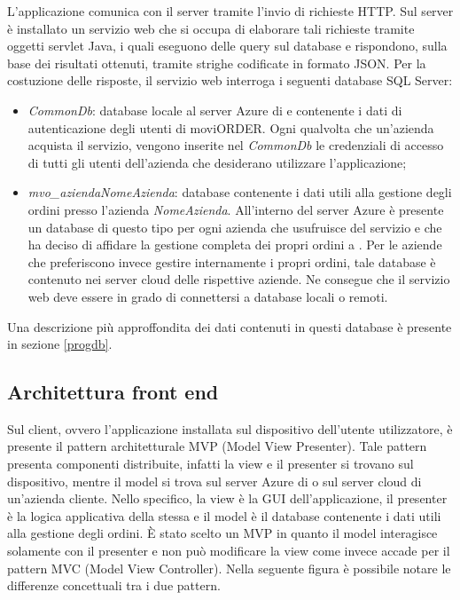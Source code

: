 L'applicazione comunica con il server tramite l'invio di richieste HTTP. Sul server è installato un servizio web che si occupa di elaborare tali richieste tramite oggetti servlet Java, i quali eseguono delle query sul database e rispondono, sulla base dei risultati ottenuti, tramite strighe codificate in formato JSON. Per la costuzione delle risposte, il servizio web interroga i seguenti database SQL Server:
\begin{itemize}
	\item \textit{CommonDb}: database locale al server Azure di \visione{} e contenente i dati di autenticazione degli utenti di moviORDER. Ogni qualvolta che un'azienda acquista il servizio, vengono inserite nel \textit{CommonDb} le credenziali di accesso di tutti gli utenti dell'azienda che desiderano utilizzare l'applicazione;
	\item \textit{mvo\_aziendaNomeAzienda}: database contenente i dati utili alla gestione degli ordini presso l'azienda \textit{NomeAzienda}. All'interno del server Azure è presente un database di questo tipo per ogni azienda che usufruisce del servizio e che ha deciso di affidare la gestione completa dei propri ordini a \visione{}. Per le aziende che preferiscono invece gestire internamente i propri ordini, tale database è contenuto nei server cloud delle rispettive aziende. Ne consegue che il servizio web deve essere in grado di connettersi a database locali o remoti.
\end{itemize}
Una descrizione più approffondita dei dati contenuti in questi database è presente in sezione \ref{progdb}.

\subsection{Architettura front end}

Sul client, ovvero l'applicazione installata sul dispositivo dell'utente utilizzatore, è presente il pattern architetturale MVP (Model View Presenter). Tale pattern presenta componenti distribuite, infatti la view e il presenter si trovano sul dispositivo, mentre il model si trova sul server Azure di \visione{} o sul server cloud di un'azienda cliente. Nello specifico, la view è la GUI dell'applicazione, il presenter è la logica applicativa della stessa e il model è il database contenente i dati utili alla gestione degli ordini. È stato scelto un MVP in quanto il model interagisce solamente con il presenter e non può modificare la view come invece accade per il pattern MVC (Model View Controller). Nella seguente figura è possibile notare le differenze concettuali tra i due pattern.

